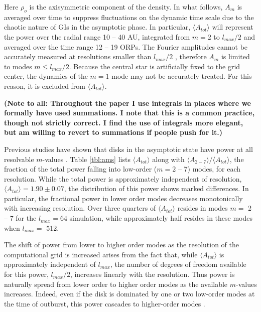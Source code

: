 \documentclass[manuscript]{aastex}
\begin{document}
Here  $\rho_o$ is the axisymmetric component of the density. In what follows, $A_m$ is averaged over time to suppress fluctuations on the dynamic time scale due to the chaotic nature of GIs in the asymptotic  phase.
In particular, $\langle A_{tot} \rangle$ will represent the power over the radial range 10 -- 40 AU, integrated from $ m = 2$ to $l_{max}/2$ and averaged over the time range 12 -- 19 ORPs. The Fourier amplitudes cannot be accurately measured at resolutions smaller than $l_{max}/2$ \citep{shannon1984}, therefore $A_m$ is limited to modes $m \le l_{max}/2$.  
Because the central star is artificially fixed to the grid center, the dynamics of the $m=1$ mode may not
be accurately treated. For this reason, it is excluded from $\langle A_{tot} \rangle$.

{\bf (Note to all: Throughout the paper I use integrals in places where we 
formally have used summations.  I note that this is a common practice, though
not strictly correct.  I find the use of integrals more elegant, but am willing to
revert to summations if people push for it.)}

Previous studies have shown that disks in the asymptotic state have power at all resolvable $m$-values  \citep{lodato2004,mejia2005,boley2006,cossins2009}.  Table \ref{tbl:ams} lists $\langle A_{tot} \rangle$ along with $\langle A_{2-7} \rangle  /  \langle A_{tot} \rangle$,  the fraction of the total power falling into low-order ($m = 2$ -- 7) modes, for each resolution. While the total power is approximately independent of resolution, $\langle A_{tot} \rangle = 1.90 \pm 0.07$, 
the distribution of this power shows marked differences. In particular, the fractional power in lower order modes decreases monotonically with increasing resolution.  Over three quarters of $\langle A_{tot} \rangle$ resides
in modes $m =$ 2 -- 7 for the $l_{max} = 64$ simulation, while approximately half resides in these modes when $l_{max} =$ 512.

The shift of power from lower to higher order modes as the resolution of the computational grid is increased arises from the fact that, while $\langle A_{tot} \rangle$ is approximately independent of $l_{max}$,  the number of degrees of freedom available for this power, $l_{max}/2$, increases linearly with the resolution. Thus power is naturally spread from lower order to higher order modes as the available $m$-values increases. Indeed, even if the disk is dominated by one or two low-order modes at the time of outburst, this power cascades to higher-order modes \citep[for example][]{laughlin1997, laughlin1998,laughlin1996}.
\end{document}
